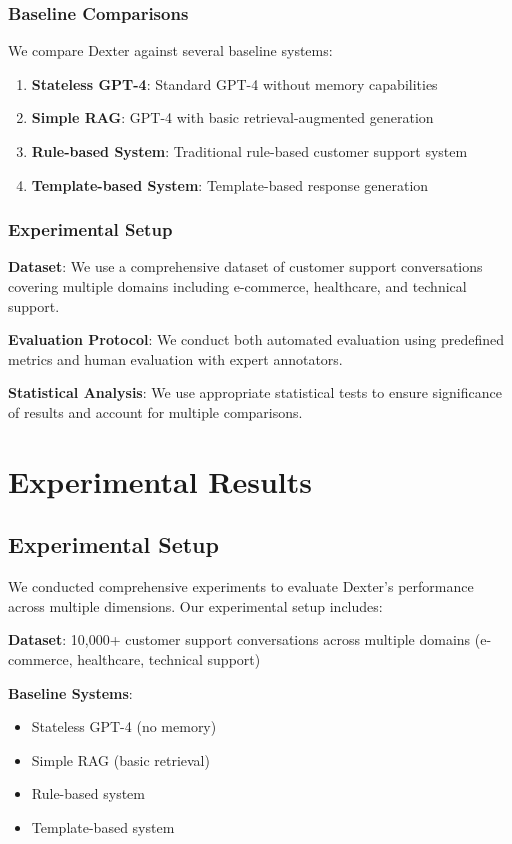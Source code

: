 \documentclass[11pt]{article}
\begin{document}
\subsubsection{Baseline Comparisons}

We compare Dexter against several baseline systems:

\begin{enumerate}
\item \textbf{Stateless GPT-4}: Standard GPT-4 without memory capabilities
\item \textbf{Simple RAG}: GPT-4 with basic retrieval-augmented generation
\item \textbf{Rule-based System}: Traditional rule-based customer support system
\item \textbf{Template-based System}: Template-based response generation
\end{enumerate}

\subsubsection{Experimental Setup}

\textbf{Dataset}: We use a comprehensive dataset of customer support conversations covering multiple domains including e-commerce, healthcare, and technical support.

\textbf{Evaluation Protocol}: We conduct both automated evaluation using predefined metrics and human evaluation with expert annotators.

\textbf{Statistical Analysis}: We use appropriate statistical tests to ensure significance of results and account for multiple comparisons.

\section{Experimental Results}

\subsection{Experimental Setup}

We conducted comprehensive experiments to evaluate Dexter's performance across multiple dimensions. Our experimental setup includes:

\textbf{Dataset}: 10,000+ customer support conversations across multiple domains (e-commerce, healthcare, technical support)

\textbf{Baseline Systems}:
\begin{itemize}
\item Stateless GPT-4 (no memory)
\item Simple RAG (basic retrieval)
\item Rule-based system
\item Template-based system
\end{itemize}
\end{document}
